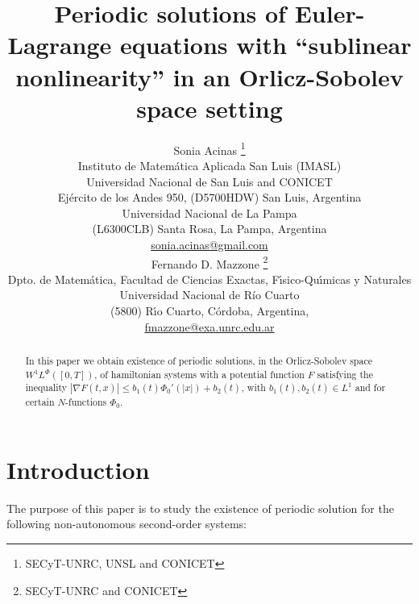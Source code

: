 \documentclass[twoside]{article}
\title{Periodic solutions of 
Euler-Lagrange equations with ``sublinear nonlinearity'' in an Orlicz-Sobolev space setting}
\author{Sonia Acinas \thanks{SECyT-UNRC, UNSL and CONICET}\\
Instituto de Matem\'atica Aplicada San Luis (IMASL)\\ 
Universidad Nacional de San Luis and CONICET\\
Ej\'ercito de los Andes 950,
(D5700HDW) San Luis, Argentina\\
Universidad Nacional de La Pampa\\
(L6300CLB) Santa Rosa, La Pampa, Argentina\\
\url{sonia.acinas@gmail.com}\\[3mm]
Fernando D. Mazzone \thanks{SECyT-UNRC and CONICET}\\
Dpto. de Matem\'atica, Facultad de Ciencias Exactas, F\'{\i}sico-Qu\'{\i}micas y Naturales\\
Universidad Nacional de R\'{i}o Cuarto\\
(5800) R\'{\i}o Cuarto, C\'ordoba, Argentina,\\
\url{fmazzone@exa.unrc.edu.ar}
}
\date{}
\theoremstyle{remark}
\newcommand{\lphi}{L^{\Phi}}
\newcommand{\wphi}{W^{1}\lphi}
\renewcommand{\leq}{\leqslant}
\begin{document}
\maketitle
%
\begingroup%
    \renewcommand{\thefootnote}{}%
    \endgroup
%
%
%
%

\begin{abstract}

In this paper we obtain existence of periodic solutions, in the Orlicz-Sobolev space $\wphi([0,T])$, of hamiltonian systems with a potential  function $F$ satisfying the inequality  $|\nabla F(t,x)|\leq b_1(t) \Phi_0'(|x|)+b_2(t)$, with    $b_1(t), b_2(t)\in L^1$ and for certain $N$-functions $\Phi_0$.

\end{abstract}




\pagestyle{fancy} \headheight 35pt \fancyhead{} \fancyfoot{}

\fancyfoot[C]{\thepage}  \fancyhead[CO]{\nouppercase{\section}}

\fancyhead[CO]{\nouppercase{\leftmark}}






\section{Introduction}
The purpose of this paper is to study the existence  of periodic solution for the
following non-autonomous second-order systems:
\end{document}
